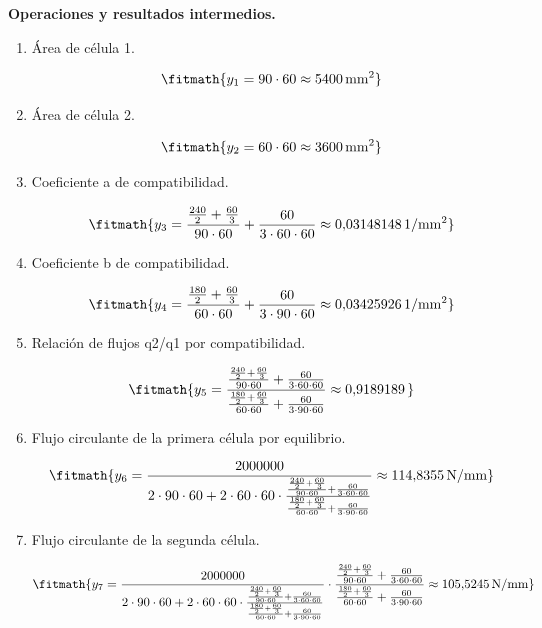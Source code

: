 \noindent\textbf{Operaciones y resultados intermedios.}

\begin{enumerate}

\item Área de célula 1.

\[\fitmath{y_{1}=90\cdot 60\approx 5400\,\mathrm{mm^{2}}}\]

\item Área de célula 2.

\[\fitmath{y_{2}=60\cdot 60\approx 3600\,\mathrm{mm^{2}}}\]

\item Coeficiente a de compatibilidad.

\[\fitmath{y_{3}=\frac{\frac{240}{2}+\frac{60}{3}}{90\cdot 60}+\frac{60}{3\cdot 60\cdot 60}\approx 0{,}03148148\,\mathrm{1/mm^{2}}}\]

\item Coeficiente b de compatibilidad.

\[\fitmath{y_{4}=\frac{\frac{180}{2}+\frac{60}{3}}{60\cdot 60}+\frac{60}{3\cdot 90\cdot 60}\approx 0{,}03425926\,\mathrm{1/mm^{2}}}\]

\item Relación de flujos q2/q1 por compatibilidad.

\[\fitmath{y_{5}=\frac{\frac{\frac{240}{2}+\frac{60}{3}}{90\cdot 60}+\frac{60}{3\cdot 60\cdot 60}}{\frac{\frac{180}{2}+\frac{60}{3}}{60\cdot 60}+\frac{60}{3\cdot 90\cdot 60}}\approx 0{,}9189189\,}\]

\item Flujo circulante de la primera célula por equilibrio.

\[\fitmath{y_{6}=\frac{2000000}{2\cdot 90\cdot 60+2\cdot 60\cdot 60\cdot \frac{\frac{\frac{240}{2}+\frac{60}{3}}{90\cdot 60}+\frac{60}{3\cdot 60\cdot 60}}{\frac{\frac{180}{2}+\frac{60}{3}}{60\cdot 60}+\frac{60}{3\cdot 90\cdot 60}}}\approx 114{,}8355\,\mathrm{N/mm}}\]

\item Flujo circulante de la segunda célula.

\[\fitmath{y_{7}=\frac{2000000}{2\cdot 90\cdot 60+2\cdot 60\cdot 60\cdot \frac{\frac{\frac{240}{2}+\frac{60}{3}}{90\cdot 60}+\frac{60}{3\cdot 60\cdot 60}}{\frac{\frac{180}{2}+\frac{60}{3}}{60\cdot 60}+\frac{60}{3\cdot 90\cdot 60}}}\cdot \frac{\frac{\frac{240}{2}+\frac{60}{3}}{90\cdot 60}+\frac{60}{3\cdot 60\cdot 60}}{\frac{\frac{180}{2}+\frac{60}{3}}{60\cdot 60}+\frac{60}{3\cdot 90\cdot 60}}\approx 105{,}5245\,\mathrm{N/mm}}\]


\end{enumerate}

